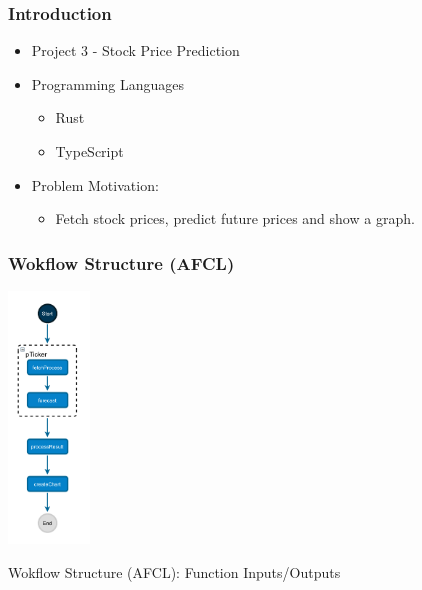 \documentclass[11pt,t,usepdftitle=false,aspectratio=169]{beamer}
\begin{document}
\begin{frame}
\frametitle{Introduction}
  \begin{itemize}
    \item Project 3 - Stock Price Prediction
    \item Programming Languages
      \begin{itemize}
        \item Rust
        \item TypeScript
      \end{itemize}
    \item Problem Motivation:
      \begin{itemize}
        \item Fetch stock prices, predict future prices and show a graph.
      \end{itemize}
  \end{itemize}
\end{frame}

\begin{frame}
  \frametitle{Wokflow Structure (AFCL)}
  \begin{center}
    \includegraphics[height=6.7cm, keepaspectratio]{./assets/afcl}
  \end{center}
\end{frame}

\begin{frame}{Wokflow Structure (AFCL): Function Inputs/Outputs}
\end{frame}
\end{document}
